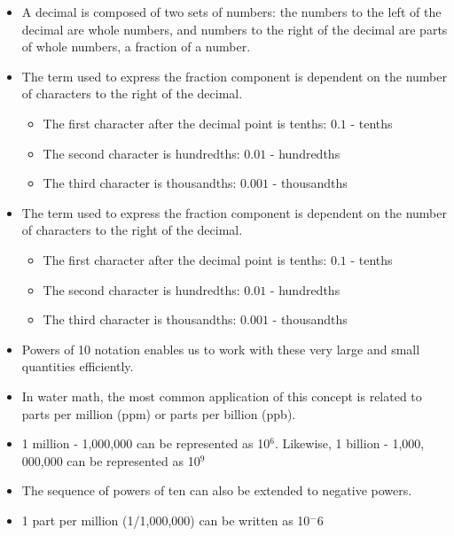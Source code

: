 \begin{itemize}
\item A decimal is composed of two sets of numbers: the numbers to the left of the decimal are whole numbers, and numbers to the right of the decimal are parts of whole numbers, a fraction of a number.\\

\item The term used to express the fraction component is dependent on the number of characters to the right of the decimal.

\begin{itemize}
  \item The first character after the decimal point is tenths: $0.1$ - tenths

  \item The second character is hundredths: $0.01$ - hundredths

  \item The third character is thousandths: $0.001$ - thousandths
\end{itemize}

\item The term used to express the fraction component is dependent on the number of characters to the right of the decimal.

\begin{itemize}
  \item The first character after the decimal point is tenths: $0.1$ - tenths

  \item The second character is hundredths: $0.01$ - hundredths

  \item The third character is thousandths: $0.001$ - thousandths
\end{itemize}

\item Powers of 10 notation enables us to work with these very large and small quantities efficiently.
\item In water math, the most common application of this concept is related to parts per million (ppm) or parts per billion (ppb).
\item 1 million - 1,000,000 can be represented as 10$^6$.  Likewise, 1 billion - 1,000, 000,000 can be represented as 10$^9$
\item The sequence of powers of ten can also be extended to negative powers.
\item 1 part per million (1/1,000,000) can be written as 10$^-6$
\end{itemize}



